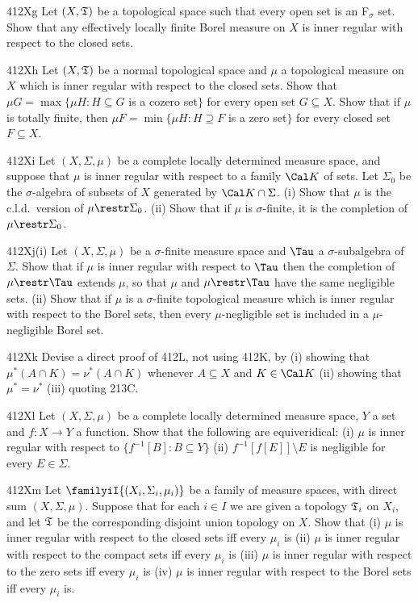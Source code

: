 {\spheader 412Xg Let $(X,\frak T)$ be a topological space such that every
open set is an F$_{\sigma}$ set.   Show that any effectively locally
finite Borel measure on $X$ is inner regular with respect to the closed
sets.

\spheader 412Xh Let $(X,\frak T)$ be a normal topological space and
$\mu$ a topological measure on $X$ which is inner regular with respect
to the closed sets.   Show that
$\mu G=\max\{\mu H:H\subseteq G$ is a cozero set$\}$ for every open set
$G\subseteq X$.   Show that if $\mu$ is totally finite, then
$\mu F=\min\{\mu H:H\supseteq F$ is a zero set$\}$ for every closed set
$F\subseteq X$.

\spheader 412Xi Let $(X,\Sigma,\mu)$ be a complete locally determined
measure space, and suppose that $\mu$ is inner regular with respect to a
family $\Cal K$ of sets.   Let $\Sigma_0$ be the $\sigma$-algebra of
subsets of
$X$ generated by $\Cal K\cap\Sigma$.   (i) Show that $\mu$ is the
c.l.d.\ version of $\mu\restr\Sigma_0$.      (ii) Show
that if $\mu$ is
$\sigma$-finite, it is the completion of $\mu\restr\Sigma_0$.

\sqheader 412Xj(i) Let $(X,\Sigma,\mu)$ be a $\sigma$-finite
measure space and $\Tau$ a $\sigma$-subalgebra of $\Sigma$.   Show that
if $\mu$ is inner regular
with respect to $\Tau$ then the completion of $\mu\restr\Tau$ extends
$\mu$, so that $\mu$ and $\mu\restr\Tau$ have the same negligible sets.
(ii) Show that if $\mu$ is a $\sigma$-finite topological measure which
is inner regular
with respect to the Borel sets, then every $\mu$-negligible set is
included in a $\mu$-negligible Borel set.

\spheader 412Xk Devise a direct proof of 412L, not using 412K, by (i)
showing that $\mu^*(A\cap K)=\nu^*(A\cap K)$ whenever $A\subseteq X$ and
$K\in\Cal K$ (ii) showing that $\mu^*=\nu^*$ (iii) quoting 213C.

\spheader 412Xl Let $(X,\Sigma,\mu)$ be a complete locally determined
measure space, $Y$ a set and $f:X\to Y$ a function.   Show that the
following are equiveridical:  (i) $\mu$ is inner regular with respect to
$\{f^{-1}[B]:B\subseteq Y\}$ (ii) $f^{-1}[f[E]]\setminus E$ is
negligible for every $E\in\Sigma$.

\spheader 412Xm Let $\familyiI{(X_i,\Sigma_i,\mu_i)}$ be a family of
measure spaces, with direct sum $(X,\Sigma,\mu)$.   Suppose that for
each $i\in I$ we are given a topology $\frak T_i$ on $X_i$, and let
$\frak T$ be
the corresponding disjoint union topology on $X$.   Show that (i) $\mu$
is inner regular with respect to the closed sets iff every $\mu_i$ is
(ii) $\mu$ is inner regular with respect to the compact sets iff every
$\mu_i$ is (iii) $\mu$ is inner regular with respect to the zero sets
iff every $\mu_i$ is (iv) $\mu$ is inner regular with respect to the
Borel sets iff every $\mu_i$ is.

}
